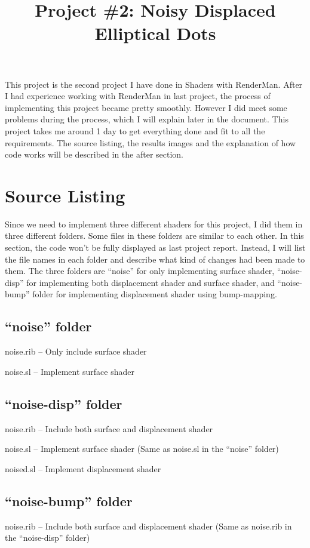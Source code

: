 \documentclass[letterpaper,14pt,titlepage,fleqn]{article}
\author{\name}
\title{Project \#2: Noisy Displaced Elliptical Dots}
\begin{document}
\maketitle

This project is the second project I have done in Shaders with RenderMan. After I had experience working with RenderMan in last project, the process of implementing this project became pretty smoothly. However I did meet some problems during the process, which I will explain later in the document. This project takes me around 1 day to get everything done and fit to all the requirements. The source listing, the results images and the explanation of how code works will be described in the after section. 

\section{Source Listing}
Since we need to implement three different shaders for this project, I did them in three different folders. Some files in these folders are similar to each other. In this section, the code won't be fully displayed as last project report. Instead, I will list the file names in each folder and describe what kind of changes had been made to them. The three folders are ``noise'' for only implementing surface shader, ``noise-disp'' for implementing both displacement shader and surface shader, and ``noise-bump'' folder for implementing displacement shader using bump-mapping.
\subsection{``noise'' folder}
noise.rib -- Only include surface shader

noise.sl -- Implement surface shader
\subsection{``noise-disp'' folder}
noise.rib -- Include both surface and displacement shader

noise.sl -- Implement surface shader (Same as noise.sl in the ``noise'' folder)

noised.sl -- Implement displacement shader
\subsection{``noise-bump'' folder}
noise.rib -- Include both surface and displacement shader (Same as noise.rib in the ``noise-disp'' folder)
\end{document}
